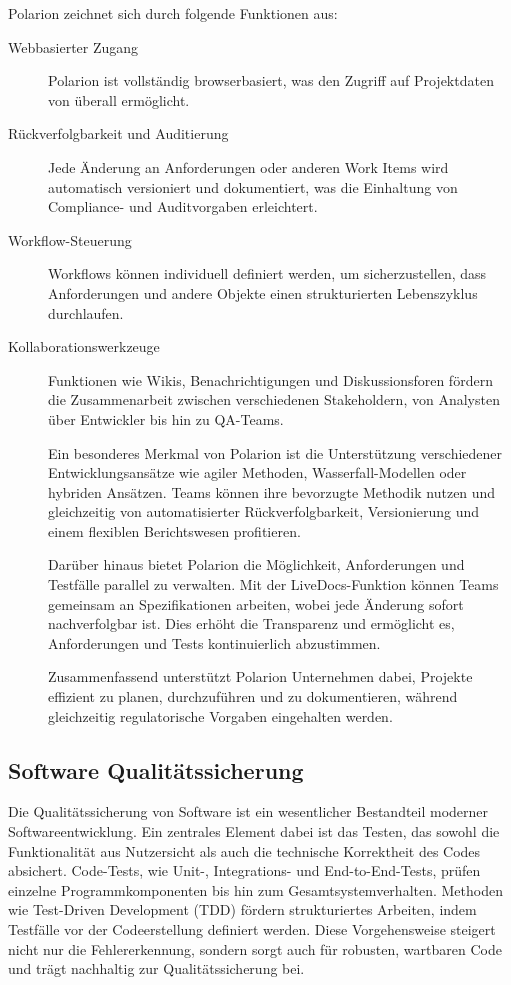 \documentclass[a4paper, 12pt]{article}
\begin{document}
Polarion zeichnet sich durch folgende Funktionen aus:\\
\begin{description}

	\item[Webbasierter Zugang] Polarion ist vollständig browserbasiert, was den Zugriff auf Projektdaten von überall ermöglicht.
	
	\item[Rückverfolgbarkeit und Auditierung] Jede Änderung an Anforderungen oder anderen Work Items wird automatisch versioniert und dokumentiert, was die Einhaltung von Compliance- und Auditvorgaben erleichtert.
	
	\item[Workflow-Steuerung] Workflows können individuell definiert werden, um sicherzustellen, dass Anforderungen und andere Objekte einen strukturierten Lebenszyklus durchlaufen.

	\item[Kollaborationswerkzeuge] Funktionen wie Wikis, Benachrichtigungen und Diskussionsforen fördern die Zusammenarbeit zwischen verschiedenen Stakeholdern, von Analysten über Entwickler bis hin zu QA-Teams.
	
Ein besonderes Merkmal von Polarion ist die Unterstützung verschiedener Entwicklungsansätze wie agiler Methoden, Wasserfall-Modellen oder hybriden Ansätzen. Teams können ihre bevorzugte Methodik nutzen und gleichzeitig von automatisierter Rückverfolgbarkeit, Versionierung und einem flexiblen Berichtswesen profitieren.

Darüber hinaus bietet Polarion die Möglichkeit, Anforderungen und Testfälle parallel zu verwalten. Mit der LiveDocs-Funktion können Teams gemeinsam an Spezifikationen arbeiten, wobei jede Änderung sofort nachverfolgbar ist. Dies erhöht die Transparenz und ermöglicht es, Anforderungen und Tests kontinuierlich abzustimmen.

Zusammenfassend unterstützt Polarion Unternehmen dabei, Projekte effizient zu planen, durchzuführen und zu dokumentieren, während gleichzeitig regulatorische Vorgaben eingehalten werden. \cite{polarion_web}
\end{description}

\subsection{Software Qualitätssicherung}
Die Qualitätssicherung von Software ist ein wesentlicher Bestandteil moderner Softwareentwicklung. Ein zentrales Element dabei ist das Testen, das sowohl die Funktionalität aus Nutzersicht als auch die technische Korrektheit des Codes absichert. Code-Tests, wie Unit-, Integrations- und End-to-End-Tests, prüfen einzelne Programmkomponenten bis hin zum Gesamtsystemverhalten. Methoden wie Test-Driven Development (TDD) fördern strukturiertes Arbeiten, indem Testfälle vor der Codeerstellung definiert werden. Diese Vorgehensweise steigert nicht nur die Fehlererkennung, sondern sorgt auch für robusten, wartbaren Code und trägt nachhaltig zur Qualitätssicherung bei. \cite{grundlagen_sw_entwicklung}
\end{document}
